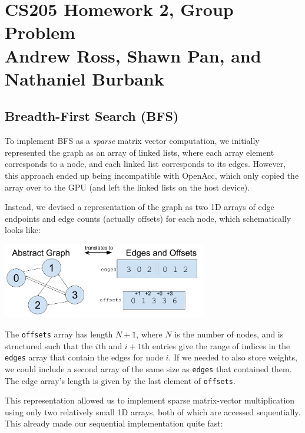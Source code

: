 \documentclass[12pt]{article}
\begin{document}
\section*{CS205 Homework 2, Group Problem\\ \small Andrew Ross, Shawn Pan, and Nathaniel Burbank}

\subsection*{Breadth-First Search (BFS)}

To implement BFS as a \textit{sparse} matrix vector computation, we initially
represented the graph as an array of linked lists, where each array element
corresponds to a node, and each linked list corresponds to its edges.
However, this approach ended up being incompatible with OpenAcc, which only
copied the array over to the GPU (and left the linked lists on the host device).

Instead, we devised a representation of the graph as two 1D arrays of edge endpoints
and edge counts (actually offsets) for each node, which schematically looks like:

\begin{center}
\includegraphics[width=0.67\textwidth]{edgeoffset.png}
\end{center}

The \texttt{offsets} array has length $N+1$, where $N$ is the number of nodes,
and is structured such that the $i$th and $i+1$th entries give the range
of indices in the \texttt{edges} array that contain the edges for node $i$.
If we needed to also store weights, we could include a second array of the same
size as \texttt{edges} that contained them. The edge array's length is given by
 the last element of \texttt{offsets}.

This representation allowed us to implement sparse matrix-vector multiplication
using only two relatively small 1D arrays, both of which are accessed sequentially.
This already made our sequential implementation quite fast:
\end{document}
